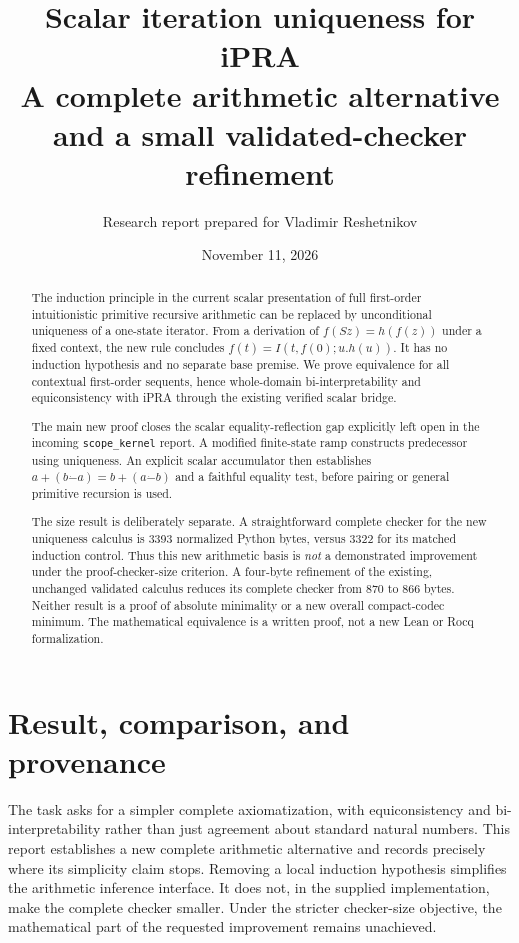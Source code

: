 \documentclass[11pt]{article}
\title{Scalar iteration uniqueness for iPRA\\[5pt]
\large A complete arithmetic alternative and a small validated-checker refinement}
\author{Research report prepared for Vladimir Reshetnikov}
\date{November 11, 2026}
\theoremstyle{definition}\newtheorem{definition}[theorem]{Definition}
\newcommand{\dotminus}{\mathbin{\dot{-}}}
\begin{document}
\maketitle
\begin{abstract}
The induction principle in the current scalar presentation of full
first-order intuitionistic primitive recursive arithmetic can be replaced
by unconditional uniqueness of a one-state iterator.  From a derivation of
$f(Sz)=h(f(z))$ under a fixed context, the new rule concludes
$f(t)=I(t,f(0);u.h(u))$.  It has no induction hypothesis and no separate
base premise.  We prove equivalence for all contextual first-order
sequents, hence whole-domain bi-interpretability and equiconsistency
with iPRA through the existing verified scalar bridge.

The main new proof closes the scalar equality-reflection gap explicitly
left open in the incoming \texttt{scope\_kernel} report.  A modified
finite-state ramp constructs predecessor using uniqueness.  An explicit
scalar accumulator then establishes
$a+(b\mathbin{\dotminus}a)=b+(a\mathbin{\dotminus}b)$ and a faithful
equality test, before pairing or general primitive recursion is used.

The size result is deliberately separate.  A straightforward complete
checker for the new uniqueness calculus is 3393 normalized Python bytes,
versus 3322 for its matched induction control.  Thus this new arithmetic
basis is \emph{not} a demonstrated improvement under the proof-checker-size
criterion.  A four-byte refinement of the existing, unchanged validated
calculus reduces its complete checker from 870 to 866 bytes.  Neither
result is a proof of absolute minimality or a new overall compact-codec
minimum.  The mathematical equivalence is a written proof, not a new
Lean or Rocq formalization.
\end{abstract}
\newpage
\tableofcontents
\newpage

\section{Result, comparison, and provenance}

The task asks for a simpler complete axiomatization, with equiconsistency
and bi-interpretability rather than just agreement about standard natural
numbers.  This report establishes a new complete arithmetic alternative
and records precisely where its simplicity claim stops.  Removing a local
induction hypothesis simplifies the arithmetic inference interface.
It does not, in the supplied implementation, make the complete checker
smaller.  Under the stricter checker-size objective, the mathematical
part of the requested improvement remains unachieved.
\end{document}
